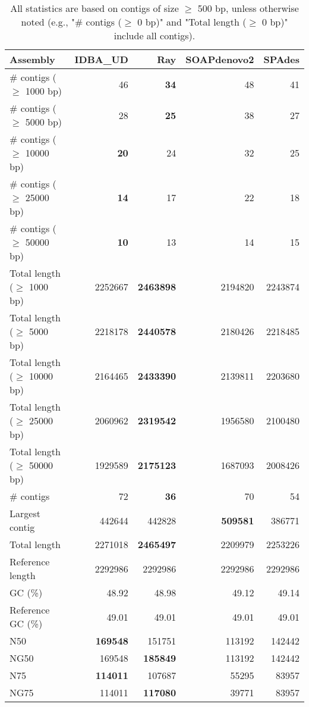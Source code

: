 \documentclass[12pt,a4paper]{article}
\begin{document}
\begin{table}[ht]
\begin{center}
\caption{All statistics are based on contigs of size $\geq$ 500 bp, unless otherwise noted (e.g., "\# contigs ($\geq$ 0 bp)" and "Total length ($\geq$ 0 bp)" include all contigs).}
\begin{tabular}{|l*{4}{|r}|}
\hline
Assembly & IDBA\_UD & Ray & SOAPdenovo2 & SPAdes \\ \hline
\# contigs ($\geq$ 1000 bp) & 46 & {\bf 34} & 48 & 41 \\ \hline
\# contigs ($\geq$ 5000 bp) & 28 & {\bf 25} & 38 & 27 \\ \hline
\# contigs ($\geq$ 10000 bp) & {\bf 20} & 24 & 32 & 25 \\ \hline
\# contigs ($\geq$ 25000 bp) & {\bf 14} & 17 & 22 & 18 \\ \hline
\# contigs ($\geq$ 50000 bp) & {\bf 10} & 13 & 14 & 15 \\ \hline
Total length ($\geq$ 1000 bp) & 2252667 & {\bf 2463898} & 2194820 & 2243874 \\ \hline
Total length ($\geq$ 5000 bp) & 2218178 & {\bf 2440578} & 2180426 & 2218485 \\ \hline
Total length ($\geq$ 10000 bp) & 2164465 & {\bf 2433390} & 2139811 & 2203680 \\ \hline
Total length ($\geq$ 25000 bp) & 2060962 & {\bf 2319542} & 1956580 & 2100480 \\ \hline
Total length ($\geq$ 50000 bp) & 1929589 & {\bf 2175123} & 1687093 & 2008426 \\ \hline
\# contigs & 72 & {\bf 36} & 70 & 54 \\ \hline
Largest contig & 442644 & 442828 & {\bf 509581} & 386771 \\ \hline
Total length & 2271018 & {\bf 2465497} & 2209979 & 2253226 \\ \hline
Reference length & 2292986 & 2292986 & 2292986 & 2292986 \\ \hline
GC (\%) & 48.92 & 48.98 & 49.12 & 49.14 \\ \hline
Reference GC (\%) & 49.01 & 49.01 & 49.01 & 49.01 \\ \hline
N50 & {\bf 169548} & 151751 & 113192 & 142442 \\ \hline
NG50 & 169548 & {\bf 185849} & 113192 & 142442 \\ \hline
N75 & {\bf 114011} & 107687 & 55295 & 83957 \\ \hline
NG75 & 114011 & {\bf 117080} & 39771 & 83957 \\ \hline

\end{tabular}
\end{center}
\end{table}
\end{document}

